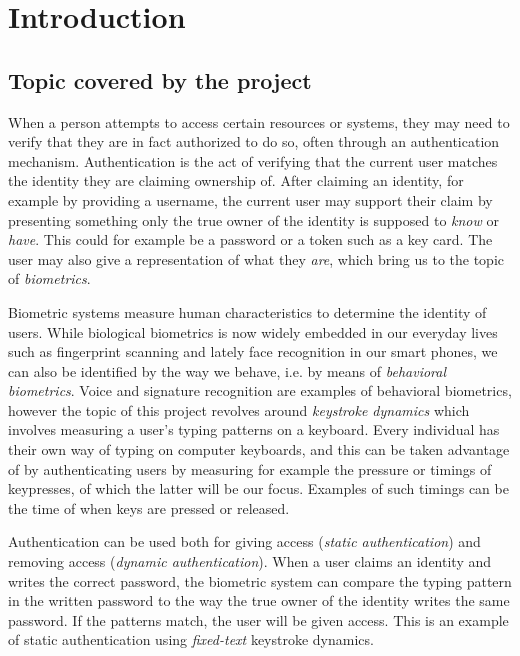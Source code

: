 \documentclass[informationsecurity]{gucmasterproject}
\begin{document}
\chapter{Introduction}

\section{Topic covered by the project}
\label{sec:topic}
When a person attempts to access certain resources or systems, they may need to verify that they are in fact authorized to do so, often through an authentication mechanism.
Authentication is the act of verifying that the current user matches the identity they are claiming ownership of.
After claiming an identity, for example by providing a username, the current user may support their claim by presenting something only the true owner of the identity is supposed to \textit{know} or \textit{have}.
This could for example be a password or a token such as a key card.
The user may also give a representation of what they \textit{are}, which bring us to the topic of \textit{biometrics}.

Biometric systems measure human characteristics to determine the identity of users.
While biological biometrics is now widely embedded in our everyday lives such as fingerprint scanning and lately face recognition in our smart phones, we can also be identified by the way we behave, i.e. by means of \textit{behavioral biometrics}.
Voice and signature recognition are examples of behavioral biometrics, however the topic of this project revolves around \textit{keystroke dynamics} which involves measuring a user's typing patterns on a keyboard.
Every individual has their own way of typing on computer keyboards, and this can be taken advantage of by authenticating users by measuring for example the pressure or timings of keypresses, of which the latter will be our focus.
Examples of such timings can be the time of when keys are pressed or released. 

Authentication can be used both for giving access (\textit{static authentication}) and removing access (\textit{dynamic authentication}).
When a user claims an identity and writes the correct password, the biometric system can compare the typing pattern in the written password to the way the true owner of the identity writes the same password.
If the patterns match, the user will be given access.
This is an example of static authentication using \textit{fixed-text} keystroke dynamics.
\end{document}
